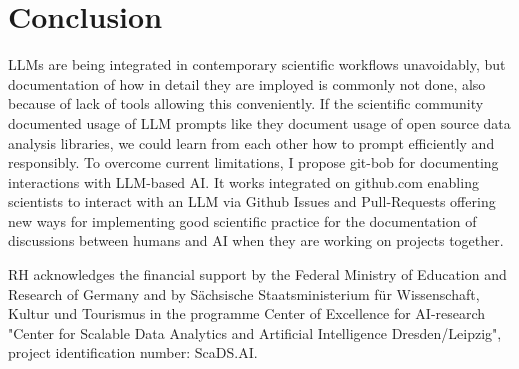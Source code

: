 \documentclass{ecai}
\begin{document}
\section{Conclusion}

LLMs are being integrated in contemporary scientific workflows unavoidably, but documentation of how in detail they are imployed is commonly not done, also because of lack of tools allowing this conveniently. If the scientific community documented usage of LLM prompts like they document usage of open source data analysis libraries, we could learn from each other how to prompt efficiently and responsibly. To overcome current limitations, I propose git-bob for documenting interactions with LLM-based AI. It works integrated on github.com enabling scientists to interact with an LLM via Github Issues and Pull-Requests offering new ways for implementing good scientific practice for the documentation of discussions between humans and AI when they are working on projects together.



\begin{ack}
RH acknowledges the financial support by the Federal Ministry of Education and Research of Germany and by Sächsische Staatsministerium für Wissenschaft, Kultur und Tourismus in the programme Center of Excellence for AI-research "Center for Scalable Data Analytics and Artificial Intelligence Dresden/Leipzig", project identification number: ScaDS.AI.

\end{ack}




\end{document}
